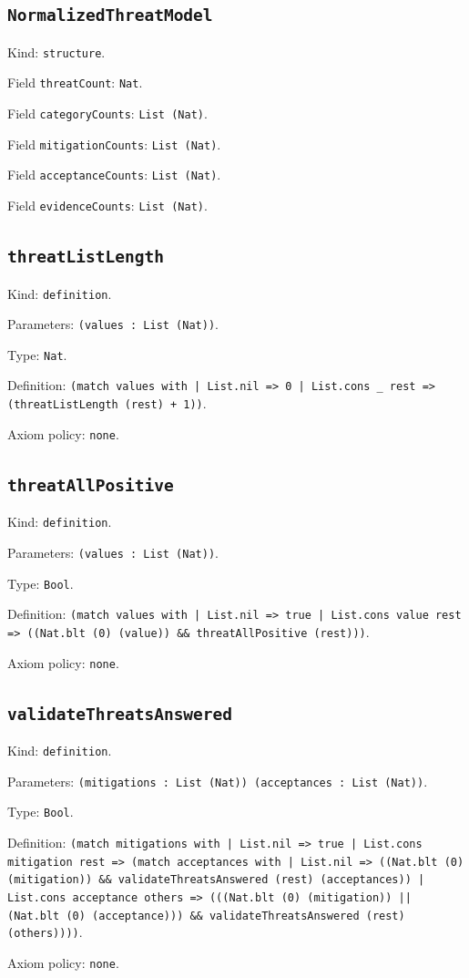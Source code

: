 \documentclass[11pt]{article}
\begin{document}
\subsection*{\texttt{NormalizedThreatModel}}
\noindent Kind: \texttt{structure}.\par
\noindent Field \texttt{threatCount}: \texttt{Nat}.\par
\noindent Field \texttt{categoryCounts}: \texttt{List (Nat)}.\par
\noindent Field \texttt{mitigationCounts}: \texttt{List (Nat)}.\par
\noindent Field \texttt{acceptanceCounts}: \texttt{List (Nat)}.\par
\noindent Field \texttt{evidenceCounts}: \texttt{List (Nat)}.\par
\subsection*{\texttt{threatListLength}}
\noindent Kind: \texttt{definition}.\par
\noindent Parameters: \texttt{(values : List (Nat))}.\par
\noindent Type: \texttt{Nat}.\par
\noindent Definition: \texttt{(match values with | List.nil => 0 | List.cons \_ rest => (threatListLength (rest) + 1))}.\par
\noindent Axiom policy: \texttt{none}.\par
\subsection*{\texttt{threatAllPositive}}
\noindent Kind: \texttt{definition}.\par
\noindent Parameters: \texttt{(values : List (Nat))}.\par
\noindent Type: \texttt{Bool}.\par
\noindent Definition: \texttt{(match values with | List.nil => true | List.cons value rest => ((Nat.blt (0) (value)) \&\& threatAllPositive (rest)))}.\par
\noindent Axiom policy: \texttt{none}.\par
\subsection*{\texttt{validateThreatsAnswered}}
\noindent Kind: \texttt{definition}.\par
\noindent Parameters: \texttt{(mitigations : List (Nat)) (acceptances : List (Nat))}.\par
\noindent Type: \texttt{Bool}.\par
\noindent Definition: \texttt{(match mitigations with | List.nil => true | List.cons mitigation rest => (match acceptances with | List.nil => ((Nat.blt (0) (mitigation)) \&\& validateThreatsAnswered (rest) (acceptances)) | List.cons acceptance others => (((Nat.blt (0) (mitigation)) || (Nat.blt (0) (acceptance))) \&\& validateThreatsAnswered (rest) (others))))}.\par
\noindent Axiom policy: \texttt{none}.\par
\end{document}
